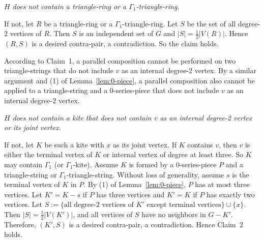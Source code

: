\documentclass{article}
\newcommand{\idq}{{}^{\alpha}_{\omega}}
\begin{document}
\medskip
{} {\sl $H$ does not contain a triangle-ring or a $\Gamma_1$-triangle-ring.}
\medskip

 If not, let $R$ be a triangle-ring or a $\Gamma_1$-triangle-ring. Let $S$ be the set of all degree-2 vertices of $R$. Then  $S$ is an independent set of $G$ and $|S|=\frac 1 2 |V(R)|$. Hence $(R, S)$ is a desired contra-pair, a contradiction. %
So the claim holds. 
\medskip

According to Claim~1, a parallel composition cannot be performed on two triangle-strings that do not include $v$ as an internal degree-2 vertex. By a similar argument and (1) of Lemma~\ref{lem:0-piece}, a parallel composition also cannot be applied to a triangle-string and a $0$-series-piece that does not include $v$ as an internal degree-2 vertex.


\medskip
{} {\sl $H$ does not contain a kite that does not contain $v$ as an internal degree-2 vertex or its joint vertex.}
\medskip

 If not, let $K$ be such a kite with $x$ as its joint vertex. If $K$ contains $v$, then $v$ is either the terminal vertex of $K$ or internal vertex of degree at least three. So $K$ may contain $\Gamma_1$ (or $\Gamma_1$-kite). Assume $K$ is formed by a $0$-series-piece $P$ and a triangle-string or $\Gamma_1$-triangle-string. Without loss of generality, assume $s$ is the terminal vertex of $K$ in $P$. By (1) of Lemma~\ref{lem:0-piece},  $P$ has at most three vertices. Let $K'=K-s$ if $P$ has three vertices and $K'=K$ if $P$ has exactly two vertices. 
Let $S:=\{\mbox{all degree-2 vertices of } K' \mbox{ except terminal vertices} \}\cup \{x\}$. Then $|S|=\frac 1 2 |V(K')|$, and all vertices of $S$ have no neighbors in $G-K'$. Therefore, $(K', S)$ is a desired contra-pair, a contradiction. 
Hence Claim~2 holds. 
\medskip
\end{document}
